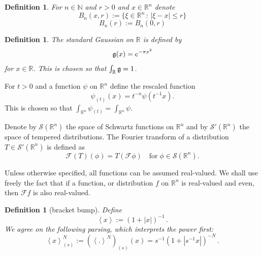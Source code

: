 \documentclass[12pt,reqno]{amsart}
\theoremstyle{plain}
\newtheorem{definition}[theorem]{Definition}
\numberwithin{equation}{section}
\theoremstyle{remark}
\newcommand{\uses}[1]{}
\newcommand{\usesdefs}[1]{}
\newcommand{\R}{{\mathbb R}}
\newcommand{\N}{{\mathbb N}}
\begin{document}
\begin{definition}\label{closed ball}\uses{}\usesdefs{}
    For $n\in\N$ and $r>0$ and $x\in \R^n$ denote
\begin{equation}\label{auto:closed-ball-definition} B_n(x,r) := \{ \xi\in\mathbb{R}^n\,:\, |\xi-x|\le r \} \end{equation}
\begin{equation}\label{auto:centered-closed-ball-definition} B_n(r) := B_n(0,r) \end{equation}

\end{definition}


\begin{definition}\label{gaussian}\uses{}\usesdefs{}
The standard Gaussian on $\R$ is defined by
\begin{equation}\label{standard Gaussian formula}
\mathfrak{g}(x)=e^{-\pi x^2}
\end{equation}
for $x\in\R$. This is chosen so that $\int_{\R}\g=1$.
\end{definition}


For $t>0$ and a function $\psi$ on $\R^n$ define the rescaled function
\begin{equation}\label{auto:L1-normalized-dilation}
\psi_{(t)}(x)=t^{-n} \psi(t^{-1}x).
\end{equation}
This is chosen so that $\int_{\R^n} \psi_{(t)} = \int_{\R^n} \psi$.

Denote by $\mathcal{S}(\R^n)$ the space of Schwartz functions on $\R^n$ and by $\mathcal{S}'(\R^n)$ the space of tempered distributions. The Fourier transform of a distribution $T\in\mathcal{S}'(\R^n)$ is defined as
\begin{equation}\label{auto:Fourier-transform-of-distribution} \mathcal{F}(T)(\phi) = T(\mathcal{F}\phi)\quad\text{for}\;\phi\in\mathcal{S}(\R^n). \end{equation}

Unless otherwise specified, all functions can be assumed real-valued.
We shall use freely the fact that if a function, or distribution $f$ on $\R^n$ is real-valued and even, then $\mathcal{F} f$ is also real-valued.


\begin{definition}[bracket bump]\label{bracket bump}\uses{}\usesdefs{}
Define
\begin{equation}\label{auto:bracket-weight-definition}
    \left<x\right>:=(1+|x|)^{-1}\, .
\end{equation}
We agree on the following parsing, which interprets the power first:
\begin{equation}\label{auto:scaled-bracket-weight}
    \left<x\right>^N_{(s)}:=(\left< .\right>^N)_{(s)}(x)=s^{-1}(1+|s^{-1}x|)^{-N}\, .
\end{equation}
\end{definition}
\end{document}
